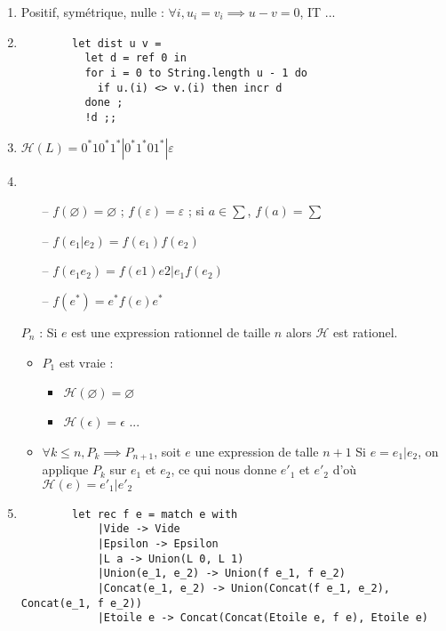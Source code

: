 \documentclass{article}
\begin{document}
\begin{enumerate}
    \item Positif, sym\'etrique, nulle : $\forall i, u_i = v_i \implies u - v = 0$, IT ...
    \item \begin{verbatim}
        let dist u v =
          let d = ref 0 in 
          for i = 0 to String.length u - 1 do 
            if u.(i) <> v.(i) then incr d
          done ;
          !d ;;
    \end{verbatim}
    \item $\mathcal{H}(L) = 0^*10^*1^* | 0^*1^*01^* | \varepsilon$ 
    \item \begin{itemize}
        \item[--] $f(\varnothing) = \varnothing$ ;
            $f(\varepsilon) = \varepsilon$ ; 
            si $a \in \sum$, $f(a) = \sum $
        \item[--] $f(e_1|e_2) = f(e_1)f(e_2)$
        \item[--] $f(e_1e_2) = f(e1)e2 | e_1f(e_2)$
        \item[--] $f(e^*) = e^*f(e)e^*$
    \end{itemize}
    $P_n$ : Si $e$ est une expression rationnel de taille $n$ alors $\mathcal{H}$ est rationel.
    \begin{itemize}
        \item $P_1$ est vraie : \begin{itemize}
            \item $\mathcal{H}(\varnothing) = \varnothing$
            \item $\mathcal{H}(\epsilon) = \epsilon$ ...
        \end{itemize}
        \item $\forall k \leq n, P_k \implies P_{n + 1}$, soit $e$ une expression de talle $n + 1$ \newline
            Si $e = e_1|e_2$, on applique $P_k$ sur $e_1$ et $e_2$, ce qui nous donne $e'_1$ et $e'_2$ d'où $\mathcal{H}(e) = e'_1|e'_2$
    \end{itemize}
    \item \begin{verbatim}
        let rec f e = match e with
            |Vide -> Vide
            |Epsilon -> Epsilon
            |L a -> Union(L 0, L 1)
            |Union(e_1, e_2) -> Union(f e_1, f e_2)
            |Concat(e_1, e_2) -> Union(Concat(f e_1, e_2), Concat(e_1, f e_2))
            |Etoile e -> Concat(Concat(Etoile e, f e), Etoile e)
    \end{verbatim}
\end{enumerate}
\end{document}
